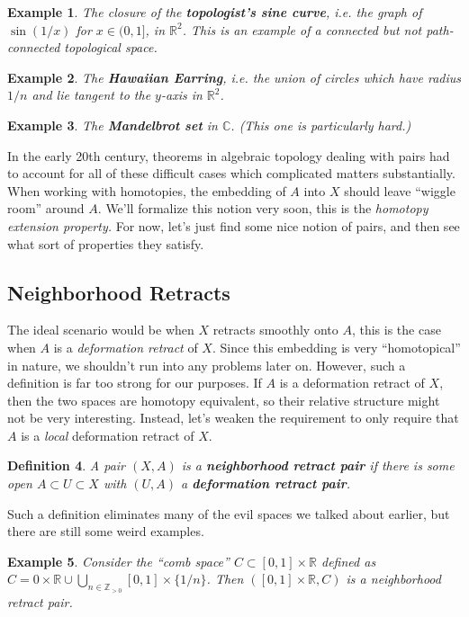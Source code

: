 \documentclass[12pt]{article}
\providecommand{\R}{\mathbb{R}}
\providecommand{\C}{\mathbb{C}}
\providecommand{\Z}{\mathbb{Z}}
\newtheorem{definition}{Definition}[subsection]
\newtheorem{example}[definition]{Example}
\begin{document}
\begin{example}
  The closure of the \textbf{topologist's sine curve}, i.e. the graph of $\sin(1/x)$ for $x\in (0,1]$, in $\R^2$. This is an example of a connected but not path-connected topological space.
\end{example}

\begin{example}
  The \textbf{Hawaiian Earring}, i.e. the union of circles which have radius $1/n$ and lie tangent to the $y$-axis in $\R^2$.
\end{example}

\begin{example}
  The \textbf{Mandelbrot set} in $\C$. (This one is particularly hard.)
\end{example}

In the early 20th century, theorems in algebraic topology dealing with pairs had to account for all of these difficult cases which complicated matters substantially. When working with homotopies, the embedding of $A$ into $X$ should leave ``wiggle room'' around $A$. We'll formalize this notion very soon, this is the \emph{homotopy extension property.} For now, let's just find some nice notion of pairs, and then see what sort of properties they satisfy.

\subsection{Neighborhood Retracts}

The ideal scenario would be when $X$ retracts smoothly onto $A$, this is the case when $A$ is a \emph{deformation retract} of $X$. Since this embedding is very ``homotopical'' in nature, we shouldn't run into any problems later on. However, such a definition is far too strong for our purposes. If $A$ is a deformation retract of $X$, then the two spaces are homotopy equivalent, so their relative structure might not be very interesting. Instead, let's weaken the requirement to only require that $A$ is a \emph{local} deformation retract of $X$.

\begin{definition}
  A pair $(X, A)$ is a \textbf{neighborhood retract pair} if there is some open $A\subset U\subset X$ with $(U, A)$ a \textbf{deformation retract pair}.
\end{definition}

Such a definition eliminates many of the evil spaces we talked about earlier, but there are still some weird examples.
\begin{example}
  Consider the ``comb space'' $C\subset [0,1]\times \R$ defined as $C=0\times \R\cup\bigcup_{n\in \Z_{>0}} [0,1]\times \{1/n\}$. Then $([0,1]\times \R, C)$ is a neighborhood retract pair.
\end{example}
\end{document}
